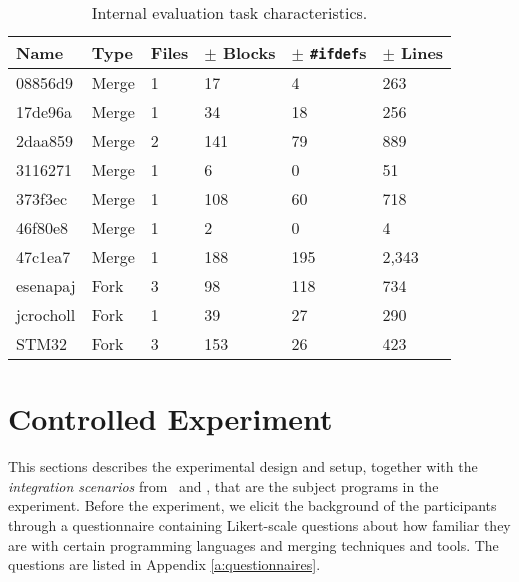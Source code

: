 \begin{table}[ht]
    \centering
    \caption{Internal evaluation task characteristics.}
    \label{tab:internalchar}
    \begin{tabular}{lll|lll}
\hline\hline
\textbf{Name} & \textbf{Type} & \textbf{Files} & \textbf{$\pm$ Blocks} & \textbf{$\pm$ \texttt{\#ifdef}s} & \textbf{$\pm$ Lines} \\
\hline
08856d9      & Merge     & 1 & 17    & 4     & 263   \\
17de96a      & Merge     & 1 & 34    & 18    & 256   \\
2daa859      & Merge     & 2 & 141 & 79      & 889   \\
3116271      & Merge     & 1 & 6     & 0     & 51    \\
373f3ec      & Merge     & 1 & 108 & 60      & 718   \\
46f80e8      & Merge     & 1 & 2     & 0     & 4     \\
47c1ea7      & Merge     & 1 & 188   & 195   & 2,343 \\
\hline
esenapaj     & Fork         & 3 & 98    & 118   & 734   \\
jcrocholl    & Fork         & 1 & 39    & 27    & 290   \\
STM32        & Fork         & 3 & 153   & 26    & 423   \\
\hline\hline
    \end{tabular}
\end{table}

\section{Controlled Experiment}
This sections describes the experimental design and setup, together with the \textit{integration scenarios} from \busybox~and \vim, that are the subject programs in the experiment. Before the experiment, we elicit the background of the participants through a questionnaire containing Likert-scale questions about how familiar they are with certain programming languages and merging techniques and tools. The questions are listed in Appendix \ref{a:questionnaires}.

\newcommand{\HA}{Integration in \tooln~is faster than in Eclipse CDT}
\newcommand{\HB}{Integration in \tooln~requires fewer edit operations than in Eclipse CDT}
\newcommand{\HC}{Integration in \tooln~does not lead to more defects than in Eclipse CDT}

